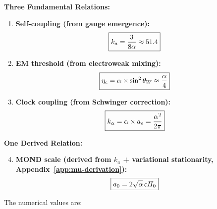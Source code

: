 \begin{tcolorbox}[colback=green!5!white, colframe=green!50!black, title=The $\alpha$-Relations: Three Fundamental + One Derived]
\textbf{Three Fundamental Relations:}
\begin{enumerate}
\item \textbf{Self-coupling (from gauge emergence):}
\begin{equation}\label{eq:alpha-ka}
\boxed{k_a = \frac{3}{8\alpha} \approx 51.4}
\end{equation}

\item \textbf{EM threshold (from electroweak mixing):}
\begin{equation}\label{eq:alpha-eta}
\boxed{\eta_c = \alpha \times \sin^2\theta_W \approx \frac{\alpha}{4}}
\end{equation}

\item \textbf{Clock coupling (from Schwinger correction):}
\begin{equation}\label{eq:alpha-clock}
\boxed{k_\alpha = \alpha \times a_e = \frac{\alpha^2}{2\pi}}
\end{equation}
\end{enumerate}

\textbf{One Derived Relation:}
\begin{enumerate}
\setcounter{enumi}{3}
\item \textbf{MOND scale (derived from $k_a$ + variational stationarity, Appendix~\ref{app:mu-derivation}):}
\begin{equation}\label{eq:alpha-mond}
\boxed{a_0 = 2\sqrt{\alpha}\, c H_0}
\end{equation}
\end{enumerate}
\end{tcolorbox}

The numerical values are:
\begin{table}[h]
\centering
\caption{Fundamental relations and values.}\label{tab:constants}
\end{table}

